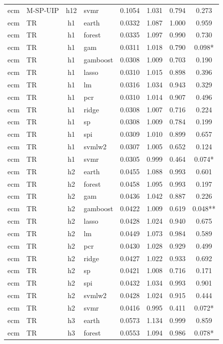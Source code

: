 \begin{ThreePartTable}
\begin{longtable}[t]{llclcccc}
ecm & M-SP-UIP & h12 & svmr & 0.1054 & 1.031 & 0.794 & 0.273\\
\addlinespace
ecm & TR & h1 & earth & 0.0332 & 1.087 & 1.000 & 0.959\\
ecm & TR & h1 & forest & 0.0335 & 1.097 & 0.990 & 0.730\\
ecm & TR & h1 & gam & 0.0311 & 1.018 & 0.790 & 0.098*\\
ecm & TR & h1 & gamboost & 0.0308 & 1.009 & 0.703 & 0.190\\
ecm & TR & h1 & lasso & 0.0310 & 1.015 & 0.898 & 0.396\\
ecm & TR & h1 & lm & 0.0316 & 1.034 & 0.943 & 0.329\\
ecm & TR & h1 & pcr & 0.0310 & 1.014 & 0.907 & 0.496\\
ecm & TR & h1 & ridge & 0.0308 & 1.007 & 0.716 & 0.224\\
ecm & TR & h1 & sp & 0.0308 & 1.009 & 0.784 & 0.199\\
ecm & TR & h1 & spi & 0.0309 & 1.010 & 0.899 & 0.657\\
ecm & TR & h1 & svmlw2 & 0.0307 & 1.005 & 0.652 & 0.124\\
ecm & TR & h1 & svmr & 0.0305 & 0.999 & 0.464 & 0.074*\\
\addlinespace
ecm & TR & h2 & earth & 0.0455 & 1.088 & 0.993 & 0.601\\
ecm & TR & h2 & forest & 0.0458 & 1.095 & 0.993 & 0.197\\
ecm & TR & h2 & gam & 0.0436 & 1.042 & 0.887 & 0.226\\
ecm & TR & h2 & gamboost & 0.0422 & 1.009 & 0.619 & 0.048**\\
ecm & TR & h2 & lasso & 0.0428 & 1.024 & 0.940 & 0.675\\
ecm & TR & h2 & lm & 0.0449 & 1.073 & 0.984 & 0.589\\
ecm & TR & h2 & pcr & 0.0430 & 1.028 & 0.929 & 0.499\\
ecm & TR & h2 & ridge & 0.0427 & 1.022 & 0.933 & 0.692\\
ecm & TR & h2 & sp & 0.0421 & 1.008 & 0.716 & 0.171\\
ecm & TR & h2 & spi & 0.0432 & 1.034 & 0.993 & 0.901\\
ecm & TR & h2 & svmlw2 & 0.0428 & 1.024 & 0.915 & 0.444\\
ecm & TR & h2 & svmr & 0.0416 & 0.995 & 0.411 & 0.072*\\
\addlinespace
ecm & TR & h3 & earth & 0.0573 & 1.134 & 0.999 & 0.859\\
ecm & TR & h3 & forest & 0.0553 & 1.094 & 0.986 & 0.078*\\

\end{longtable}
\end{ThreePartTable}
